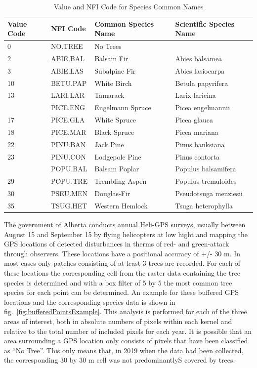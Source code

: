 \documentclass[
]{article}
\begin{document}
\begin{table}

\caption{\label{tab:species}Value and NFI Code for Species Common Names}
\centering
\begin{tabular}[t]{llll}
\toprule
Value Code & NFI Code & Common Species Name & Scientific Species Name\\
\midrule
0 & NO.TREE & No Trees & \\
2 & ABIE.BAL & Balsam Fir & Abies balsamea\\
3 & ABIE.LAS & Subalpine Fir & Abies lasiocarpa\\
10 & BETU.PAP & White Birch & Betula papyrifera\\
13 & LARI.LAR & Tamarack & Larix laricina\\
\addlinespace
16 & PICE.ENG & Engelmann Spruce & Picea engelmannii\\
17 & PICE.GLA & White Spruce & Picea glauca\\
18 & PICE.MAR & Black Spruce & Picea mariana\\
22 & PINU.BAN & Jack Pine & Pinus banksiana\\
23 & PINU.CON & Lodgepole Pine & Pinus contorta\\
\addlinespace
27 & POPU.BAL & Balsam Poplar & Populus balsamifera\\
29 & POPU.TRE & Trembling Aspen & Populus tremuloides\\
30 & PSEU.MEN & Douglas-Fir & Pseudotsuga menziesii\\
35 & TSUG.HET & Western Hemlock & Tsuga heterophylla\\
\bottomrule
\end{tabular}
\end{table}

The government of Alberta conducts annual Heli-GPS surveys, usually between August 15 and September 15 by flying helicopters at low hight and mapping the GPS locations of detected disturbances in therms of red- and green-attack through observers. These locations have a positional accuracy of +/- 30 m. In most cases only patches consisting of at least 3 trees are recorded. For each of these locations the corresponding cell from the raster data containing the tree species is determined and with a box filter of 5 by 5 the most common tree species for each point can be determined. An example for these buffered GPS locations and the corresponding species data is shown in fig.~\ref{fig:bufferedPointsExample}. This analysis is performed for each of the three areas of interest, both in absolute numbers of pixels within each kernel and relative to the total number of included pixels for each year. It is possible that an area surrounding a GPS location only consists of pixels that have been classified as ``No Tree''. This only means that, in 2019 when the data had been collected, the corresponding 30 by 30 m cell was not predominantlyS covered by trees.
\end{document}
